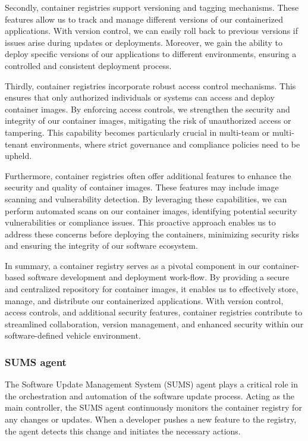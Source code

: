 \documentclass[
12pt,
oneside, 
onehalfspacing, 
nolistspacing, 
parskip, 
chapterinoneline, 
]{AASTCOMPUTER}
\begin{document}
Secondly, container registries support versioning and tagging mechanisms. These features allow us to track and manage different versions of our containerized applications. With version control, we can easily roll back to previous versions if issues arise during updates or deployments. Moreover, we gain the ability to deploy specific versions of our applications to different environments, ensuring a controlled and consistent deployment process.

Thirdly, container registries incorporate robust access control mechanisms. This ensures that only authorized individuals or systems can access and deploy container images. By enforcing access controls, we strengthen the security and integrity of our container images, mitigating the risk of unauthorized access or tampering. This capability becomes particularly crucial in multi-team or multi-tenant environments, where strict governance and compliance policies need to be upheld.

Furthermore, container registries often offer additional features to enhance the security and quality of container images. These features may include image scanning and vulnerability detection. By leveraging these capabilities, we can perform automated scans on our container images, identifying potential security vulnerabilities or compliance issues. This proactive approach enables us to address these concerns before deploying the containers, minimizing security risks and ensuring the integrity of our software ecosystem.

In summary, a container registry serves as a pivotal component in our container-based software development and deployment work-flow. By providing a secure and centralized repository for container images, it enables us to effectively store, manage, and distribute our containerized applications. With version control, access controls, and additional security features, container registries contribute to streamlined collaboration, version management, and enhanced security within our software-defined vehicle environment.

\subsubsection{SUMS agent}
The Software Update Management System (SUMS) agent plays a critical role in the orchestration and automation of the software update process. Acting as the main controller, the SUMS agent continuously monitors the container registry for any changes or updates. When a developer pushes a new feature to the registry, the agent detects this change and initiates the necessary actions.
\end{document}
